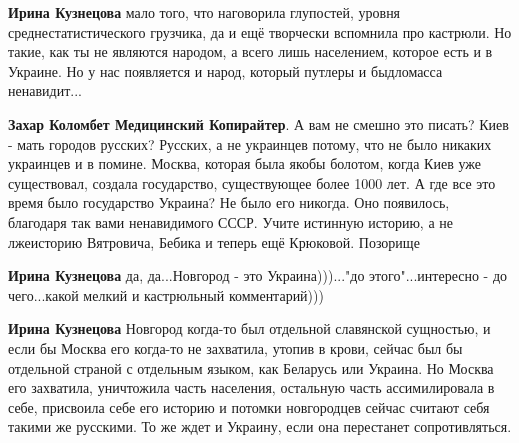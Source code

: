 \begin{itemize}
\begin{itemize}
\textbf{Ирина Кузнецова} мало того, что наговорила глупостей, уровня среднестатистического грузчика, да и ещё творчески вспомнила про кастрюли. Но такие, как ты не являются народом, а всего лишь населением, которое есть и в Украине. Но у нас появляется и народ, который путлеры и быдломасса ненавидит...

 
\textbf{Захар Коломбет Медицинский Копирайтер}. А вам не смешно это писать?
Киев - мать городов русских? Русских, а не украинцев потому, что не было
никаких украинцев и в помине. Москва, которая была якобы болотом, когда Киев
уже существовал, создала государство, существующее более 1000 лет. А где все
это время было государство Украина? Не было его никогда. Оно появилось,
благодаря так вами ненавидимого СССР. Учите истинную историю, а не лжеисторию
Вятровича, Бебика и теперь ещё Крюковой. Позорище

 
\textbf{Ирина Кузнецова} да, да...Новгород - это Украина)))..."до этого"...интересно - до чего...какой мелкий и кастрюльный комментарий)))

 
\textbf{Ирина Кузнецова} Новгород когда-то был отдельной славянской сущностью, и если бы Москва его когда-то не захватила, утопив в крови, сейчас был бы отдельной страной с отдельным языком, как Беларусь или Украина. Но Москва его захватила, уничтожила часть населения, остальную часть ассимилировала в себе, присвоила себе его историю и потомки новгородцев сейчас считают себя такими же русскими. То же ждет и Украину, если она перестанет сопротивляться.

 

\end{itemize}
\end{itemize}
